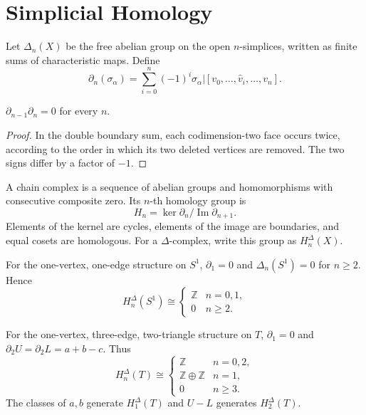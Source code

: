 \section*{Simplicial Homology}

Let $\Delta_n(X)$ be the free abelian group on the open $n$-simplices, written as finite sums of characteristic maps.  Define
\[
\partial_n(\sigma_\alpha)=\sum_{i=0}^n(-1)^i\sigma_\alpha|[v_0,\ldots,\widehat v_i,\ldots,v_n].
\]

\begin{lemma}
\label{lem:boundary-composition-zero}
\uses{}
$\partial_{n-1}\partial_n=0$ for every $n$.
\end{lemma}
\begin{proof}
\sketch In the double boundary sum, each codimension-two face occurs twice, according to the order in which its two deleted vertices are removed.  The two signs differ by a factor of $-1$.
\end{proof}

A chain complex is a sequence of abelian groups and homomorphisms with consecutive composite zero.  Its $n$-th homology group is
\[
H_n=\ker\partial_n/\operatorname{Im}\partial_{n+1}.
\]
Elements of the kernel are cycles, elements of the image are boundaries, and equal cosets are homologous.  For a $\Delta$-complex, write this group as $H_n^\Delta(X)$.

\begin{example}
\label{ex:simplicial-homology-circle}
For the one-vertex, one-edge structure on $S^1$, $\partial_1=0$ and $\Delta_n(S^1)=0$ for $n\geq2$.  Hence
\[
H_n^\Delta(S^1)\cong\begin{cases}\mathbb{Z}&n=0,1,\\0&n\geq2.\end{cases}
\]
\end{example}

\begin{example}
\label{ex:simplicial-homology-torus}
For the one-vertex, three-edge, two-triangle structure on $T$, $\partial_1=0$ and $\partial_2U=\partial_2L=a+b-c$.  Thus
\[
H_n^\Delta(T)\cong\begin{cases}\mathbb{Z}&n=0,2,\\\mathbb{Z}\oplus\mathbb{Z}&n=1,\\0&n\geq3.\end{cases}
\]
The classes of $a,b$ generate $H_1^\Delta(T)$ and $U-L$ generates $H_2^\Delta(T)$.
\end{example}

